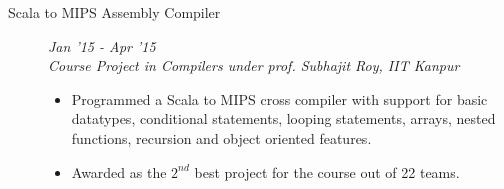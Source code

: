 \documentclass[9pt]{article}
\newenvironment{changemargin}[2]{%
  \begin{list}{}{%
    \setlength{\topsep}{0pt}%
    \setlength{\leftmargin}{#1}%
    \setlength{\rightmargin}{#2}%
    \setlength{\listparindent}{\parindent}%
    \setlength{\itemindent}{\parindent}%
    \setlength{\parsep}{\parskip}%
  }%
  \item[]}{\end{list}
}
\newenvironment{body} {
	\vspace*{-16pt}
	\begin{changemargin}{-0.6in}{-0.65in}
  }	
	{\end{changemargin}
}
\begin{document}
\begin{body}
\begin{description}
	

 	\item[\normalsize{Scala to MIPS Assembly Compiler}] \hfill \textit{Jan '15 - Apr '15} \\
 	\textit{Course Project in Compilers under prof. Subhajit Roy, IIT Kanpur}
 	\begin{itemize}
 	 \item Programmed a Scala to MIPS cross compiler with support for basic datatypes, conditional statements,
 looping statements, arrays, nested functions, recursion and object oriented features.
 	 \item Awarded as the $2^{nd}$ best project for the course out of 22 teams.
 	\end{itemize}
 	

\end{description}
\end{body}
\end{document}
